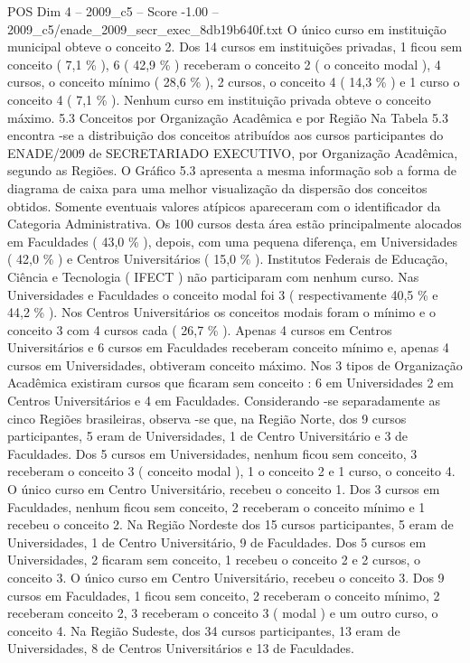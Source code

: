 \begin{textsample}{POS Dim 4 – 2009\_c5 – Score -1.00 – 2009\_c5/enade\_2009\_secr\_exec\_8db19b640f.txt}
O único curso em instituição municipal obteve o conceito 2.
Dos 14 cursos em instituições privadas, 1 ficou sem conceito ( 7,1 \% ), 6 ( 42,9 \% ) receberam o conceito 2 ( o conceito modal ), 4 cursos, o conceito mínimo ( 28,6 \% ), 2 cursos, o conceito 4 ( 14,3 \% ) e 1 curso o conceito 4 ( 7,1 \% ).
Nenhum curso em instituição privada obteve o conceito máximo. 5.3 Conceitos por Organização Acadêmica e por Região Na Tabela 5.3 encontra -se a distribuição dos conceitos atribuídos aos cursos participantes do ENADE/2009 de SECRETARIADO EXECUTIVO, por Organização Acadêmica, segundo as Regiões.
O Gráfico 5.3 apresenta a mesma informação sob a forma de diagrama de caixa para uma melhor visualização da dispersão dos conceitos obtidos.
Somente eventuais valores atípicos apareceram com o identificador da Categoria Administrativa.
Os 100 cursos desta área estão principalmente alocados em Faculdades ( 43,0 \% ), depois, com uma pequena diferença, em Universidades ( 42,0 \% ) e Centros Universitários ( 15,0 \% ).
Institutos Federais de Educação, Ciência e Tecnologia ( IFECT ) não participaram com nenhum curso.
Nas Universidades e Faculdades o conceito modal foi 3 ( respectivamente 40,5 \% e 44,2 \% ).
Nos Centros Universitários os conceitos modais foram o mínimo e o conceito 3 com 4 cursos cada ( 26,7 \% ).
Apenas 4 cursos em Centros Universitários e 6 cursos em Faculdades receberam conceito mínimo e, apenas 4 cursos em Universidades, obtiveram conceito máximo.
Nos 3 tipos de Organização Acadêmica existiram cursos que ficaram sem conceito : 6 em Universidades 2 em Centros Universitários e 4 em Faculdades.
Considerando -se separadamente as cinco Regiões brasileiras, observa -se que, na Região Norte, dos 9 cursos participantes, 5 eram de Universidades, 1 de Centro Universitário e 3 de Faculdades.
Dos 5 cursos em Universidades, nenhum ficou sem conceito, 3 receberam o conceito 3 ( conceito modal ), 1 o conceito 2 e 1 curso, o conceito 4.
O único curso em Centro Universitário, recebeu o conceito 1.
Dos 3 cursos em Faculdades, nenhum ficou sem conceito, 2 receberam o conceito mínimo e 1 recebeu o conceito 2.
Na Região Nordeste dos 15 cursos participantes, 5 eram de Universidades, 1 de Centro Universitário, 9 de Faculdades.
Dos 5 cursos em Universidades, 2 ficaram sem conceito, 1 recebeu o conceito 2 e 2 cursos, o conceito 3.
O único curso em Centro Universitário, recebeu o conceito 3.
Dos 9 cursos em Faculdades, 1 ficou sem conceito, 2 receberam o conceito mínimo, 2 receberam conceito 2, 3 receberam o conceito 3 ( modal ) e um outro curso, o conceito 4.
Na Região Sudeste, dos 34 cursos participantes, 13 eram de Universidades, 8 de Centros Universitários e 13 de Faculdades.

\end{textsample}
